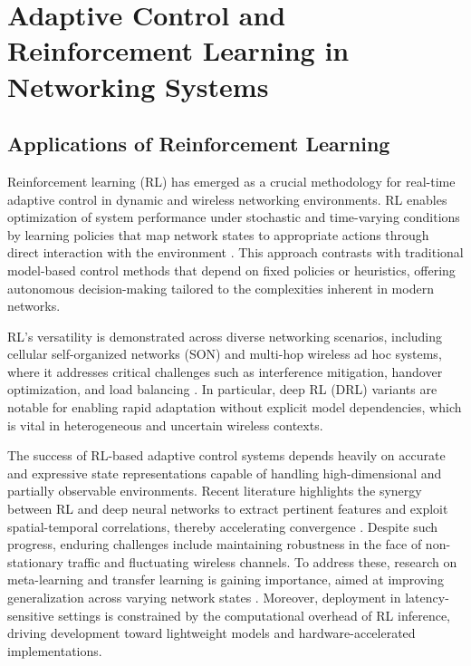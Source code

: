 \documentclass[sigconf]{acmart}
\begin{document}
\section{Adaptive Control and Reinforcement Learning in Networking Systems}

\subsection{Applications of Reinforcement Learning}

Reinforcement learning (RL) has emerged as a crucial methodology for real-time adaptive control in dynamic and wireless networking environments. RL enables optimization of system performance under stochastic and time-varying conditions by learning policies that map network states to appropriate actions through direct interaction with the environment \cite{ref2,ref5,ref7,ref12,ref31,ref32,ref33,ref34,ref35,ref50}. This approach contrasts with traditional model-based control methods that depend on fixed policies or heuristics, offering autonomous decision-making tailored to the complexities inherent in modern networks.

RL's versatility is demonstrated across diverse networking scenarios, including cellular self-organized networks (SON) and multi-hop wireless ad hoc systems, where it addresses critical challenges such as interference mitigation, handover optimization, and load balancing \cite{ref31,ref32,ref33,ref34,ref35}. In particular, deep RL (DRL) variants are notable for enabling rapid adaptation without explicit model dependencies, which is vital in heterogeneous and uncertain wireless contexts.

The success of RL-based adaptive control systems depends heavily on accurate and expressive state representations capable of handling high-dimensional and partially observable environments. Recent literature highlights the synergy between RL and deep neural networks to extract pertinent features and exploit spatial-temporal correlations, thereby accelerating convergence \cite{ref31,ref32,ref33}. Despite such progress, enduring challenges include maintaining robustness in the face of non-stationary traffic and fluctuating wireless channels. To address these, research on meta-learning and transfer learning is gaining importance, aimed at improving generalization across varying network states \cite{ref35}. Moreover, deployment in latency-sensitive settings is constrained by the computational overhead of RL inference, driving development toward lightweight models and hardware-accelerated implementations.
\end{document}
